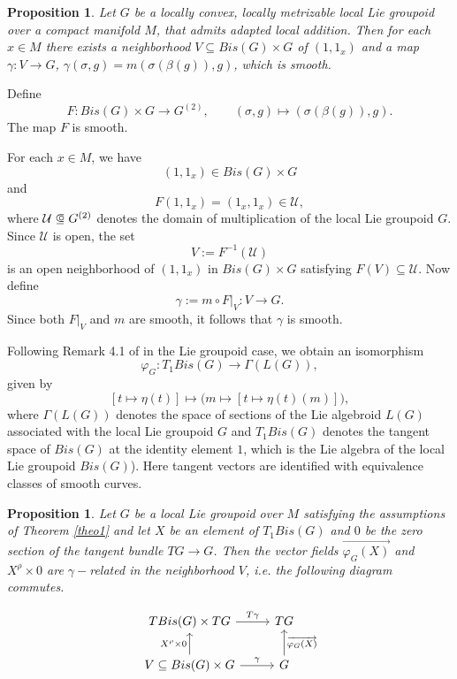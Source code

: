\documentclass[12pt,a4paper]{amsart}
\makeatletter
\theoremstyle{plain}
\newtheorem{proposition}[theorem]{Proposition}
\theoremstyle{definition}
\newcommand\opn{\mathrel{\ooalign{$\subseteq$\cr
  \hidewidth\raise.225ex\hbox{$\circ\mkern.5mu$}\cr}}}
\renewenvironment{proof}[1][\proofname]{%
  \par\vspace{0.1em} %
  \pushQED{\qed}%
  \normalfont \topsep0pt \trivlist
  \item[\hskip\labelsep\itshape #1\@addpunct{.}]\ignorespaces
}{%
  \popQED\endtrivlist\@endpefalse
}
\makeatother
\begin{document}
\begin{proposition} \label{pro1}
Let $G$ be a locally convex, locally metrizable local Lie groupoid over a compact manifold $M$, that admits adapted local addition. Then for each $x\in M$ there exists a  neighborhood $V\subseteq Bis(G)\times G$ of $(1,1_x)$  and a map 
$\gamma: V \rightarrow G$, $\gamma(\sigma,g)= m(\sigma(\beta(g)),g)$, which is smooth.
\end{proposition}


\begin{proof}
Define
\[
F:Bis(G)\times G\to G^{(2)},
\qquad
(\sigma,g)\mapsto (\sigma(\beta(g)),g).
\]
The map $F$ is smooth.

For each $x\in M$, we have
\[
(1,1_x)\in Bis(G)\times G
\]
and
\[
F(1,1_x)=(1_x,1_x)\in \mathcal U,
\]
where $\mathcal U\opn G^{(2)}$ denotes the domain of multiplication of the local Lie groupoid $G$. Since $\mathcal U$ is open, the set
\[
V:=F^{-1}(\mathcal U)
\]
is an open neighborhood of $(1,1_x)$ in $Bis(G)\times G$ satisfying
$F(V)\subseteq \mathcal U$.
Now define
\[
\gamma:=m\circ F|_V:V\to G.
\]
Since both $F|_V$ and $m$ are smooth, it follows that $\gamma$ is smooth.
\end{proof}



Following Remark 4.1 of \cite{Schmeding} in the Lie groupoid case, we obtain an isomorphism
\[
\varphi_G:T_1Bis(G)\to \Gamma(L(G)),
\]
given by
\[
[t\mapsto \eta(t)]
\mapsto
\bigl(
m\mapsto [t\mapsto \eta(t)(m)]
\bigr),
\]
where $\Gamma(L(G))$ denotes the space of sections of the Lie algebroid $L(G)$ associated with the local Lie groupoid $G$ and $T_1Bis(G)$ denotes the tangent space of  $Bis(G)$ at the identity element  $1$, which is the Lie algebra of the local Lie groupoid $Bis(G)$). Here tangent vectors are identified with equivalence classes of smooth curves.



\begin{proposition} \label{pro2}
    Let $G$ be a local Lie groupoid  over $M$ satisfying the assumptions of Theorem \ref{theo1} and let $X$ be an element of  $T_1Bis(G)$ and $0$ be the zero section of the tangent bundle  $TG \rightarrow G$. Then the vector fields 
    $\overrightarrow{\varphi_G(X)}$ and $X^{\rho}\times0$ are $\gamma-$related in the neighborhood $V$, i.e. the following diagram commutes.
    
\[\begin{tikzcd}
TBis(G)\times TG \arrow[r, "T\gamma"] & TG \\
V\subseteq Bis(G)\times G \arrow[u, "X^{\rho }\times 0"] \arrow[r, "\gamma"] & G \arrow[u, "\overrightarrow{\varphi_G(X)}"']
\end{tikzcd}\]

\end{proposition}
\end{document}
